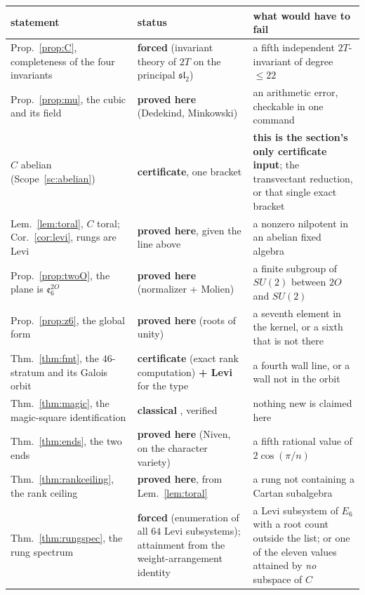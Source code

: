 \documentclass[11pt,reqno]{amsart}
\theoremstyle{plain}
\theoremstyle{definition}
\theoremstyle{remark}
\newcommand{\sll}{\mathfrak{sl}}
\newcommand{\ee}{\mathfrak{e}}
\begin{document}
\begin{table}[htbp]
\centering\small
\begin{tabular}{@{}p{}p{}p{}@{}}
\toprule
statement & status & what would have to fail\\
\midrule
Prop.~\ref{prop:C}, completeness of the four invariants
 & \textbf{forced} (invariant theory of $2T$ on the principal $\sll_2$)
 & a fifth independent $2T$-invariant of degree $\le22$\\
Prop.~\ref{prop:mu}, the cubic and its field
 & \textbf{proved here} (Dedekind, Minkowski)
 & an arithmetic error, checkable in one command\\
$C$ abelian (Scope~\ref{sc:abelian})
 & \textbf{certificate}, one bracket
 & \textbf{this is the section's only certificate input}; the
   transvectant reduction, or that single exact bracket\\
Lem.~\ref{lem:toral}, $C$ toral; Cor.~\ref{cor:levi}, rungs are Levi
 & \textbf{proved here}, given the line above
 & a nonzero nilpotent in an abelian fixed algebra\\
Prop.~\ref{prop:twoO}, the plane is $\ee_6^{2O}$
 & \textbf{proved here} (normalizer + Molien)
 & a finite subgroup of $SU(2)$ between $2O$ and $SU(2)$\\
Prop.~\ref{prop:z6}, the global form
 & \textbf{proved here} (roots of unity)
 & a seventh element in the kernel, or a sixth that is not there\\
Thm.~\ref{thm:fmt}, the $46$-stratum and its Galois orbit
 & \textbf{certificate} (exact rank computation) \textbf{+ Levi} for the type
 & a fourth wall line, or a wall not in the orbit\\
Thm.~\ref{thm:magic}, the magic-square identification
 & \textbf{classical} \cite{BartonSudbery}, verified
 & nothing new is claimed here\\
Thm.~\ref{thm:ends}, the two ends
 & \textbf{proved here} (Niven, on the character variety)
 & a fifth rational value of $2\cos(\pi/n)$\\
Thm.~\ref{thm:rankceiling}, the rank ceiling
 & \textbf{proved here}, from Lem.~\ref{lem:toral}
 & a rung not containing a Cartan subalgebra\\
Thm.~\ref{thm:rungspec}, the rung spectrum
 & \textbf{forced} (enumeration of all $64$ Levi subsystems); attainment from the
   weight-arrangement identity
 & a Levi subsystem of $E_6$ with a root count outside the list; or one of the eleven
   values attained by \emph{no} subspace of $C$\\

\end{tabular}
\end{table}
\end{document}
